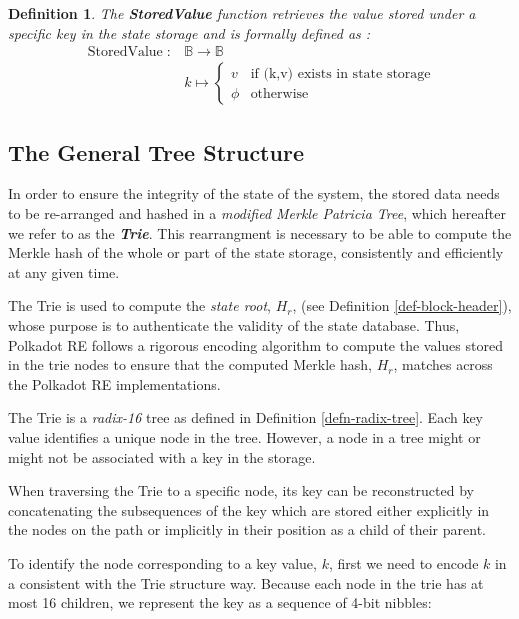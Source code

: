 \documentclass{article}
\newcommand{\tmem}[1]{{\em #1\/}}
\newcommand{\tmop}[1]{\ensuremath{\operatorname{#1}}}
\newcommand{\tmstrong}[1]{\textbf{#1}}
\newcommand{\tmtextbf}[1]{{\bfseries{#1}}}
\newcommand{\tmtextit}[1]{{\itshape{#1}}}
\newtheorem{definition}{Definition}
\providecommand{\tmem}[1]{\tmtextit{#1}}
\providecommand{\tmop}[1]{\ensuremath{\mathrm{#1}}}
\providecommand{\tmstrong}[1]{\tmtextbf{#1}}
\providecommand{\tmtextbf}[1]{\tmtextbf{#1}}
\providecommand{\tmtextit}[1]{\tmtextit{#1}}
\newtheorem{definition}{Definition}
\begin{document}
\begin{definition}
  \label{defn-stored-value}The {\tmstrong{StoredValue}} function retrieves the
  value stored under a specific key in the state storage and is formally
  defined as :
  \[ \begin{array}{cc}
       \tmop{StoredValue} : & \mathbb{B} \rightarrow \mathbb{B}\\
       & k \mapsto \left\{ \begin{array}{cc}
         v & \text{if (k,v) exists in state storage}\\
         \phi & \tmop{otherwise}
       \end{array} \right.
     \end{array} \]
  
\end{definition}

\subsection{The General Tree Structure}

In order to ensure the integrity of the state of the system, the stored data
needs to be re-arranged and hashed in a {\tmem{modified Merkle Patricia
Tree}}, which hereafter we refer to as the {\tmem{{\tmstrong{Trie}}}}. This
rearrangment is necessary to be able to compute the Merkle hash of the whole
or part of the state storage, consistently and efficiently at any given time.

The Trie is used to compute the {\tmem{state root}}, $H_r$, (see Definition
\ref{def-block-header}), whose purpose is to authenticate the validity of the
state database. Thus, Polkadot RE follows a rigorous encoding algorithm to
compute the values stored in the trie nodes to ensure that the computed Merkle
hash, $H_r$, matches across the Polkadot RE implementations.

The Trie is a {\tmem{radix-16}} tree as defined in Definition
\ref{defn-radix-tree}. Each key value identifies a unique node in the tree.
However, a node in a tree might or might not be associated with a key in the
storage.

When traversing the Trie to a specific node, its key can be reconstructed by
concatenating the subsequences of the key which are stored either explicitly
in the nodes on the path or implicitly in their position as a child of their
parent.

To identify the node corresponding to a key value, $k$, first we need to
encode $k$ in a consistent with the Trie structure way. Because each node in
the trie has at most 16 children, we represent the key as a sequence of 4-bit
nibbles:
\end{document}
